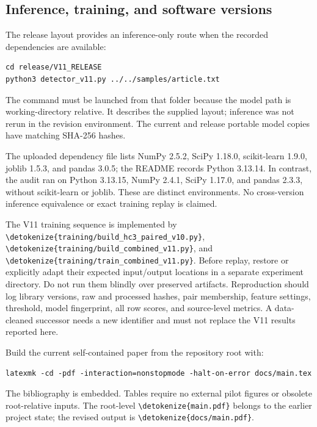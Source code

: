 \documentclass[11pt]{article}
\newcommand{\code}[1]{\expandafter\nolinkurl\expandafter{\detokenize{#1}}}
\begin{document}
\subsection{Inference, training, and software versions}
The release layout provides an inference-only route when the recorded
dependencies are available:
\begin{lstlisting}
cd release/V11_RELEASE
python3 detector_v11.py ../../samples/article.txt
\end{lstlisting}
The command must be launched from that folder because the model path is
working-directory relative. It describes the supplied layout; inference
was not rerun in the revision environment. The current and release portable
model copies have matching SHA-256 hashes.

The uploaded dependency file lists NumPy 2.5.2, SciPy 1.18.0,
scikit-learn 1.9.0, joblib 1.5.3, and pandas 3.0.5; the README records
Python 3.13.14. In contrast, the audit ran on Python 3.13.15, NumPy 2.4.1,
SciPy 1.17.0, and pandas 2.3.3, without scikit-learn or joblib. These are
distinct environments. No cross-version inference equivalence or exact
training replay is claimed.

The V11 training sequence is implemented by
\code{training/build_hc3_paired_v10.py},
\code{training/build_combined_v11.py}, and
\code{training/train_combined_v11.py}. Before replay, restore or explicitly
adapt their expected input/output locations in a separate experiment
directory. Do not run them blindly over preserved artifacts. Reproduction
should log library versions, raw and processed hashes, pair membership,
feature settings, threshold, model fingerprint, all row scores, and
source-level metrics. A data-cleaned successor needs a new identifier and
must not replace the V11 results reported here.

Build the current self-contained paper from the repository root with:
\begin{lstlisting}
latexmk -cd -pdf -interaction=nonstopmode -halt-on-error docs/main.tex
\end{lstlisting}
The bibliography is embedded. Tables require no external pilot figures or
obsolete root-relative inputs. The root-level \code{main.pdf} belongs to
the earlier project state; the revised output is \code{docs/main.pdf}.
\end{document}
